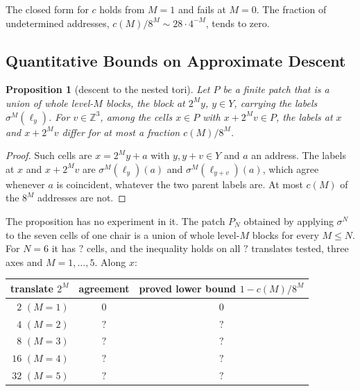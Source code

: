 \documentclass[11pt,a4paper]{article}
\newcommand{\SSChAgreeFive}{?}\newcommand{\SSChAgreeFour}{?}
\newcommand{\SSChAgreeRows}{?}\newcommand{\SSChAgreeThree}{?}
\newcommand{\SSChAgreeTwo}{?}\newcommand{\SSChBoundFive}{?}
\newcommand{\SSChBoundFour}{?}\newcommand{\SSChBoundThree}{?}
\newcommand{\SSChBoundTwo}{?}\newcommand{\SSChCharPoly}{?}\newcommand{\SSChCCoef}{?}
\newcommand{\SSChPatchCells}{?}\newcommand{\SSChRowAddr}{?}
\newcommand{\ZZ}{\mathbb{Z}}
\theoremstyle{plain}
\newtheorem{proposition}{Proposition}
\theoremstyle{definition}
\begin{document}
The closed form for $c$ holds from $M=1$ and fails at $M=0$. The fraction of undetermined
addresses, $c(M)/8^M\sim28\cdot4^{-M}$, tends to zero.

\subsection{Quantitative Bounds on Approximate Descent}
\label{sec:chair-descent}

\begin{proposition}[descent to the nested tori]
\label{prop:chair-descent}
Let $P$ be a finite patch that is a union of whole level-$M$ blocks, the block at
$2^My$, $y\in Y$, carrying the labels $\sigma^M(\ell_y)$. For $v\in\ZZ^3$, among the cells
$x\in P$ with $x+2^Mv\in P$, the labels at $x$ and $x+2^Mv$ differ for at most a fraction
$c(M)/8^M$.
\end{proposition}

\begin{proof}
Such cells are $x=2^My+a$ with $y,y+v\in Y$ and $a$ an address. The labels at $x$ and
$x+2^Mv$ are $\sigma^M(\ell_y)(a)$ and $\sigma^M(\ell_{y+v})(a)$, which agree whenever $a$
is coincident, whatever the two parent labels are. At most $c(M)$ of the $8^M$ addresses
are not.
\end{proof}

The proposition has no experiment in it. The patch $P_N$ obtained by applying $\sigma^N$
to the seven cells of one chair is a union of whole level-$M$ blocks for every $M\le N$.
For $N=6$ it has $\SSChPatchCells{}$ cells, and the inequality holds on all
$\SSChAgreeRows{}$ translates tested, three axes and $M=1,\dots,5$. Along $x$:

\begin{center}
\small
\begin{tabular}{rcc}
\toprule
translate $2^M$ & agreement & proved lower bound $1-c(M)/8^M$ \\
\midrule
$2$ $(M=1)$ & $0$ & $0$ \\
$4$ $(M=2)$ & $\SSChAgreeTwo$ & $\SSChBoundTwo$ \\
$8$ $(M=3)$ & $\SSChAgreeThree$ & $\SSChBoundThree$ \\
$16$ $(M=4)$ & $\SSChAgreeFour$ & $\SSChBoundFour$ \\
$32$ $(M=5)$ & $\SSChAgreeFive$ & $\SSChBoundFive$ \\
\bottomrule
\end{tabular}
\end{center}
\end{document}
